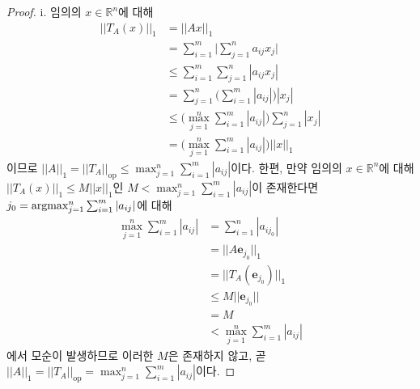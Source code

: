 \begin{proof}
    i. 임의의 $x\in\mathbb{R}^n$에 대해
    \begin{align*}
        ||T_A(x)||_1&=||Ax||_1\\
        &=\sum_{i=1}^m\bigg|\sum_{j=1}^na_{ij}x_j\bigg|\\
        &\leq\sum_{i=1}^m\sum_{j=1}^n|a_{ij}x_j|\\
        &=\sum_{j=1}^n\bigg(\sum_{i=1}^m|a_{ij}|\bigg)|x_j|\\
        &\leq\bigg(\max_{j=1}^n\sum_{i=1}^m|a_{ij}|\bigg)\sum_{j=1}^n|x_j|\\
        &=\bigg(\max_{j=1}^n\sum_{i=1}^m|a_{ij}|\bigg)||x||_1
    \end{align*}
    이므로 $||A||_1=||T_A||_\mathrm{op}\leq\max_{j=1}^n\sum_{i=1}^m|a_{ij}|$이다. 한편, 만약 임의의 $x\in\mathbb{R}^n$에 대해 $||T_A(x)||_1\leq M||x||_1$인 $M<\max_{j=1}^n\sum_{i=1}^m|a_{ij}|$이 존재한다면 $j_0=\mathrm{argmax}_{j=1}^n\sum_{i=1}^m|a_{ij}|$에 대해
    \begin{align*}
        \max_{j=1}^n\sum_{i=1}^m|a_{ij}|&=\sum_{i=1}^n|a_{ij_0}|\\
        &=||A\mathbf{e}_{j_0}||_1\\
        &=||T_A(\mathbf{e}_{j_0})||_1\\
        &\leq M||\mathbf{e}_{j_0}||\\
        &=M\\
        &<\max_{j=1}^n\sum_{i=1}^m|a_{ij}|
    \end{align*}
    에서 모순이 발생하므로 이러한 $M$은 존재하지 않고, 곧 $||A||_1=||T_A||_\mathrm{op}=\max_{j=1}^n\sum_{i=1}^m|a_{ij}|$이다.


\end{proof}
